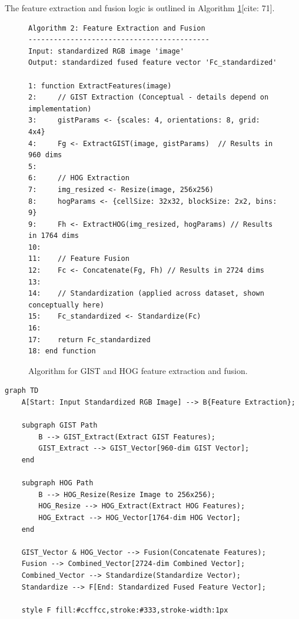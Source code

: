 The feature extraction and fusion logic is outlined in Algorithm \ref{alg:feature_extraction}[cite: 71].

\begin{figure}[h!]
\centering
\begin{verbatim}
Algorithm 2: Feature Extraction and Fusion
-------------------------------------------
Input: standardized RGB image 'image'
Output: standardized fused feature vector 'Fc_standardized'

1: function ExtractFeatures(image)
2:     // GIST Extraction (Conceptual - details depend on implementation)
3:     gistParams <- {scales: 4, orientations: 8, grid: 4x4}
4:     Fg <- ExtractGIST(image, gistParams)  // Results in 960 dims
5:     
6:     // HOG Extraction
7:     img_resized <- Resize(image, 256x256)
8:     hogParams <- {cellSize: 32x32, blockSize: 2x2, bins: 9}
9:     Fh <- ExtractHOG(img_resized, hogParams) // Results in 1764 dims
10:    
11:    // Feature Fusion
12:    Fc <- Concatenate(Fg, Fh) // Results in 2724 dims
13:   
14:    // Standardization (applied across dataset, shown conceptually here)
15:    Fc_standardized <- Standardize(Fc) 
16:    
17:    return Fc_standardized
18: end function
\end{verbatim}
\caption{Algorithm for GIST and HOG feature extraction and fusion.}
\label{alg:feature_extraction}
\end{figure}


\begin{verbatim}
graph TD
    A[Start: Input Standardized RGB Image] --> B{Feature Extraction};
    
    subgraph GIST Path
        B --> GIST_Extract(Extract GIST Features);
        GIST_Extract --> GIST_Vector[960-dim GIST Vector];
    end
    
    subgraph HOG Path
        B --> HOG_Resize(Resize Image to 256x256);
        HOG_Resize --> HOG_Extract(Extract HOG Features);
        HOG_Extract --> HOG_Vector[1764-dim HOG Vector];
    end
    
    GIST_Vector & HOG_Vector --> Fusion(Concatenate Features);
    Fusion --> Combined_Vector[2724-dim Combined Vector];
    Combined_Vector --> Standardize(Standardize Vector);
    Standardize --> F[End: Standardized Fused Feature Vector];
    
    style F fill:#ccffcc,stroke:#333,stroke-width:1px
\end{verbatim}


